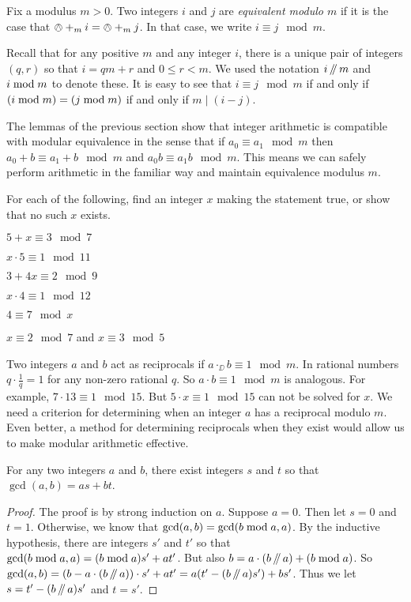 \begin{defn}\label{def:modulus}
	Fix a modulus $m>0$. Two integers $i$ and $j$ are \emph{equivalent modulo $m$} if it is the case that $\owedge +_m i = \owedge +_m j$. In that case, we write $i\equiv j\mod m$. 
\end{defn}

Recall that for any positive $m$ and any integer $i$, there is a unique pair of integers $(q,r)$ so that $i = qm + r$ and $0\leq r < m$. We used the notation $i\mathop{/\mkern-5mu/} m$ and $i\bmod m$ to denote these. It is easy to see that
$i \equiv j \mod m$ if and only if $(i\bmod m)=(j\bmod m)$ if and only if $m\mid (i-j)$.

The lemmas of the previous section show that integer arithmetic is compatible with modular equivalence in the sense that if $a_0\equiv a_1\mod m$ then $a_0 + b \equiv a_1 + b\mod m$ and $a_0b\equiv a_1b\mod m$. This means we can safely perform arithmetic in the familiar way and maintain equivalence modulus $m$. 

\begin{exer}
	For each of the following, find an integer $x$ making the statement true, or show that no such $x$ exists.
	\begin{exercise}
		\item $5 + x \equiv 3 \mod 7$
		\item $x\cdot 5\equiv 1 \mod 11$
		\item $3 + 4x \equiv 2\mod 9$
		\item $x\cdot 4 \equiv 1\mod 12$
		\item $4 \equiv 7 \mod x$
		\item $x\equiv 2\mod 7$ and $x\equiv 3\mod 5$
	\end{exercise}
\end{exer}

Two integers $a$ and $b$ act as reciprocals if $a \cdot_\DD b\equiv 1\mod m$.
In rational numbers $q\cdot \frac1q = 1$ for any non-zero rational $q$. So $a\cdot b\equiv 1\mod m$ is analogous. For example, $7\cdot 13 \equiv 1\mod 15$. But $5\cdot x \equiv 1\mod 15$ can not be solved for $x$. We need a criterion for determining when an integer $a$ has a reciprocal modulo $m$. Even better, a method for determining reciprocals when they exist would allow us to make modular arithmetic effective. 

\begin{lem}
	For any two integers $a$ and $b$, there exist integers $s$ and $t$ so that $\gcd(a,b)=as+bt$.
	
	\begin{proof}
		The proof is by strong induction on $a$. 
		Suppose $a=0$.
		Then let $s=0$ and $t=1$. Otherwise, we know that $\gcd(a,b)=\gcd(b\bmod a, a)$. By the inductive hypothesis, there are integers $s'$ and $t'$
		so that $\gcd(b\bmod a, a)= (b\bmod a)s'+at'$. But also $b = a\cdot(b\mathop{/\mkern-5mu/} a)+(b\bmod a)$.
		So $\gcd(a,b) = (b-a\cdot(b\mathop{/\mkern-5mu/} a))\cdot s' + at'= a(t'-(b\mathop{/\mkern-5mu/} a)s') + bs'$. Thus we let $s=t'-(b\mathop{/\mkern-5mu/} a)s'$ and $t=s'$.
	\end{proof}
\end{lem}



